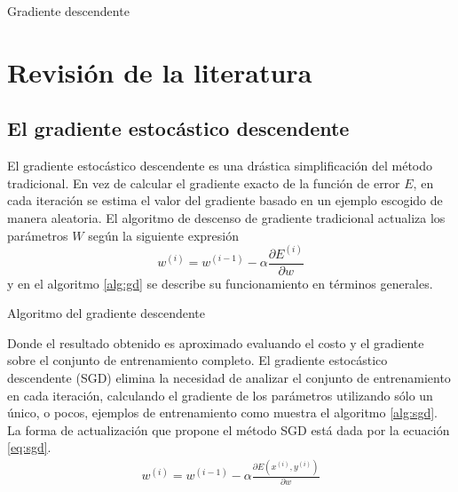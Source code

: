 \begin{imagen}
	\scalebox{1.0}{}
	\caption{Gradiente descendente}
	\label{fig:vanishing}
\end{imagen}


\section{Revisión de la literatura}
\subsection{El gradiente estocástico descendente}
El gradiente estocástico descendente es una drástica simplificación del método tradicional. En vez de calcular el gradiente exacto de la función de error $E$, en cada iteración se estima el valor del gradiente basado en un ejemplo escogido de manera aleatoria. El algoritmo de descenso de gradiente tradicional actualiza los parámetros $W$ según la siguiente expresión
$$ w^{(i)} = w^{(i - 1)} - \alpha\frac{\partial E^{(i)}}{\partial w} $$ y en el algoritmo \ref{alg:gd} se describe su funcionamiento en términos generales.

\begin{algorithm}[H]
 \caption{Algoritmo del gradiente descendente}
 \label{alg:gd}
\end{algorithm}

Donde el resultado obtenido es aproximado evaluando el costo y el gradiente sobre el conjunto de entrenamiento completo. El gradiente estocástico descendente (SGD) elimina la necesidad de analizar el conjunto de entrenamiento en cada iteración, calculando el gradiente de los parámetros utilizando sólo un único, o pocos, ejemplos de entrenamiento como muestra el algoritmo \ref{alg:sgd}. La forma de actualización que propone el método SGD está dada por la ecuación \ref{eq:sgd}.
\begin{eqnarray}
	w^{(i)} = w^{(i - 1)} - \alpha\frac{\partial E(x^{(i)}, y^{(i)})}{\partial w}\label{eq:sgd}
\end{eqnarray}

